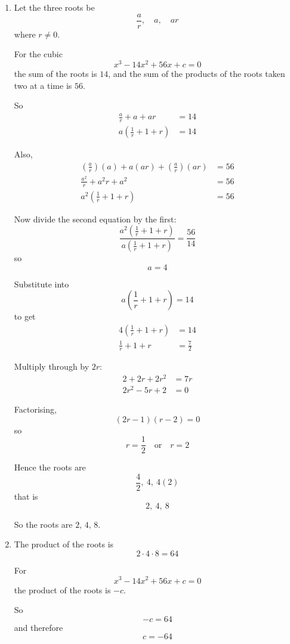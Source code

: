 \documentclass[leqno]{article}
\begin{document}
\begin{enumerate}[
  label=\textbf{\arabic*.},
  leftmargin=*,
  topsep=0pt,
  partopsep=0pt,
  parsep=0pt
]
\vspace*{10pt}

\begin{tcolorbox}[colback=white, colframe=scarlet, title={\textbf{Solution}}, breakable, grow to left by=6mm, grow to right by=10mm]
\begin{enumerate}[label=\textbf{(\alph*)}]
\item Let the three roots be
\[
\frac{a}{r},\quad a,\quad ar
\]
where $r\neq 0$.

For the cubic
\[
x^3-14x^2+56x+c=0
\]
the sum of the roots is $14$, and the sum of the products of the roots taken two at a time is $56$.

So
\begin{align*}
\frac{a}{r}+a+ar&=14 \\
a\left(\frac1r+1+r\right)&=14
\end{align*}

Also,
\begin{align*}
\left(\frac{a}{r}\right)(a)+a(ar)+\left(\frac{a}{r}\right)(ar)&=56 \\
\frac{a^2}{r}+a^2r+a^2&=56 \\
a^2\left(\frac1r+1+r\right)&=56
\end{align*}

Now divide the second equation by the first:
\[
\frac{a^2\left(\frac1r+1+r\right)}{a\left(\frac1r+1+r\right)}=\frac{56}{14}
\]
so
\[
a=4
\]

Substitute into
\[
a\left(\frac1r+1+r\right)=14
\]
to get
\begin{align*}
4\left(\frac1r+1+r\right)&=14 \\
\frac1r+1+r&=\frac72
\end{align*}

Multiply through by $2r$:
\begin{align*}
2+2r+2r^2&=7r \\
2r^2-5r+2&=0
\end{align*}

Factorising,
\[
(2r-1)(r-2)=0
\]
so
\[
r=\frac12 \quad \text{or} \quad r=2
\]

Hence the roots are
\[
\frac{4}{2},\ 4,\ 4(2)
\]
that is
\[
2,\ 4,\ 8
\]

So the roots are $\boxed{2,\,4,\,8}$.

\item The product of the roots is
\[
2\cdot 4\cdot 8=64
\]

For
\[
x^3-14x^2+56x+c=0
\]
the product of the roots is $-c$.

So
\[
-c=64
\]
and therefore
\[
c=-64
\]


\end{enumerate}
\end{tcolorbox}
\end{enumerate}
\end{document}
